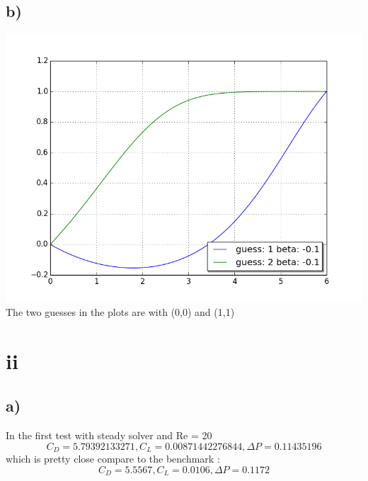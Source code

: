 \documentclass[a4paper,norsk]{article}
\begin{document}
\subsection*{b)}
\includegraphics[trim = 0mm 0mm 0mm 0mm, clip, scale=0.3]{guess.png} 
The two guesses in the plots are with (0,0) and (1,1)

\section*{ii}
\subsection*{a)}
In the first test with steady solver and Re = 20
$$C_D= 5.79392133271, C_L = 0.00871442276844, \Delta P = 0.11435196$$
which is pretty close compare to the benchmark :$$C_D =  5.5567 , C_L = 0.0106 , \Delta P =  0.1172 $$
\end{document}
